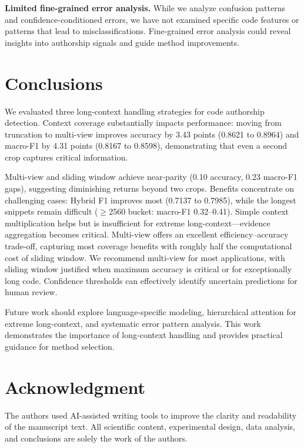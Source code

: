 \documentclass[conference]{IEEEtran}
\begin{document}
\textbf{Limited fine-grained error analysis.} While we analyze confusion patterns and confidence-conditioned errors, we have not examined specific code features or patterns that lead to misclassifications. Fine-grained error analysis could reveal insights into authorship signals and guide method improvements.

\section{Conclusions}
We evaluated three long-context handling strategies for code authorship detection. Context coverage substantially impacts performance: moving from truncation to multi-view improves accuracy by 3.43 points (0.8621 to 0.8964) and macro-F1 by 4.31 points (0.8167 to 0.8598), demonstrating that even a second crop captures critical information.

Multi-view and sliding window achieve near-parity (0.10 accuracy, 0.23 macro-F1 gaps), suggesting diminishing returns beyond two crops. Benefits concentrate on challenging cases: Hybrid F1 improves most (0.7137 to 0.7985), while the longest snippets remain difficult ($\geq$2560 bucket: macro-F1 0.32--0.41). Simple context multiplication helps but is insufficient for extreme long-context---evidence aggregation becomes critical. Multi-view offers an excellent efficiency--accuracy trade-off, capturing most coverage benefits with roughly half the computational cost of sliding window. We recommend multi-view for most applications, with sliding window justified when maximum accuracy is critical or for exceptionally long code. Confidence thresholds can effectively identify uncertain predictions for human review.

Future work should explore language-specific modeling, hierarchical attention for extreme long-context, and systematic error pattern analysis. This work demonstrates the importance of long-context handling and provides practical guidance for method selection.

\section*{Acknowledgment}
The authors used AI-assisted writing tools to improve the clarity and readability of the manuscript text. All scientific content, experimental design, data analysis, and conclusions are solely the work of the authors.



\end{document}
